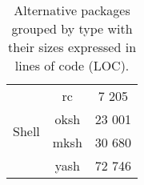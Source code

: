 \begin{table}[!ht]
\begin{tabular}{|c|c|c|}
        \hline
        \hline
        \multirow{4}{*}{Shell}
        & rc \cite{rc} & 7 205 \\
        \cline{2-3}
        & oksh \cite{oksh} & 23 001 \\
        \cline{2-3}
        & mksh \cite{mksh} & 30 680 \\
        \cline{2-3}
        & yash \cite{yash} & 72 746 \\
        \hline
    \end{tabular}
    \caption{Alternative packages grouped by type with their sizes expressed in lines of code (LOC).}
\end{table}


\newpage


